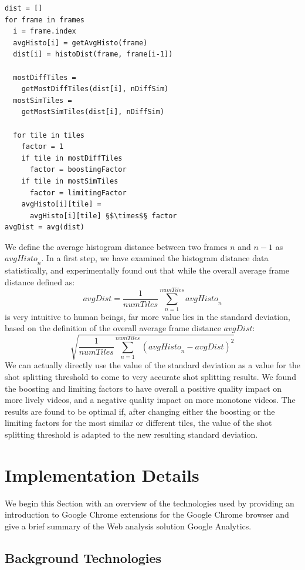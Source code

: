 \documentclass{acm_proc_article-sp}
\begin{document}
\begin{lstlisting}[caption=Pseudocode for our shot detection algorithm., label=code:algorithm, float]
dist = []
for frame in frames
  i = frame.index
  avgHisto[i] = getAvgHisto(frame)
  dist[i] = histoDist(frame, frame[i-1])

  mostDiffTiles =
    getMostDiffTiles(dist[i], nDiffSim)
  mostSimTiles =
    getMostSimTiles(dist[i], nDiffSim)

  for tile in tiles
    factor = 1
    if tile in mostDiffTiles
      factor = boostingFactor
    if tile in mostSimTiles
      factor = limitingFactor
    avgHisto[i][tile] =
      avgHisto[i][tile] §$\times$§ factor
avgDist = avg(dist)
\end{lstlisting}

We define the average histogram distance between two frames $\mathit{n}$ and $\mathit{n - 1}$ as $\mathit{avgHisto}_{n}$. In a first step, we have examined the histogram distance data statistically, and experimentally found out that while the overall average frame distance defined as: $$\mathit{avgDist} = \frac{1}{\mathit{numTiles}}\sum_{n=1}^{\mathit{numTiles}}\mathit{avgHisto}_{n}$$ is very intuitive to human beings, far more value lies in the standard deviation, based on the definition of the overall average frame distance $\mathit{avgDist}$: $$\sqrt{\frac{1}{\mathit{numTiles}}\sum_{n=1}^{\mathit{numTiles}}(\mathit{avgHisto}_{n} - \mathit{avgDist})^{2}}$$ We can actually directly use the value of the standard deviation as a value for the shot splitting threshold to come to very accurate shot splitting results. We found the boosting and limiting factors to have overall a positive quality impact on more lively videos, and a negative quality impact on more monotone videos. The results are found to be optimal if, after changing either the boosting or the limiting factors for the most similar or different tiles, the value of the shot splitting threshold is adapted to the new resulting standard deviation.

\section{Implementation Details} \label{sec:implementation}
We begin this Section with an overview of the technologies used by providing an introduction to Google Chrome extensions for the Google Chrome browser and give a brief summary of the Web analysis solution Google Analytics.

\subsection{Background Technologies}
\end{document}
